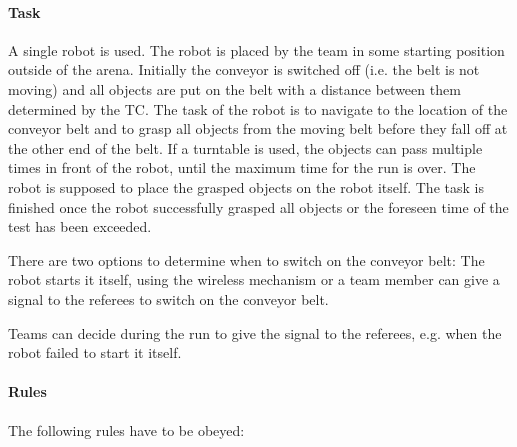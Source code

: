\paragraph{Task}
A single robot is used. The robot is placed by the team in some starting position outside of the arena. Initially the conveyor is switched off (i.e. the belt is not moving) and all objects are put on the belt with a distance between them determined by the TC. The task of the robot is to navigate to the location of the conveyor belt and to grasp all objects from the moving belt before they fall off at the other end of the belt. If a turntable is used, the objects can pass multiple times in front of the robot, until the maximum time for the run is over. The robot is supposed to place the grasped objects on the robot itself. The task is finished once the robot successfully grasped all objects or the foreseen time of the test has been exceeded. 
\par
There are two options to determine when to switch on the conveyor belt:
The robot starts it itself, using the wireless mechanism or a team member can give a signal to the referees to switch on the conveyor belt.
\par
Teams can decide during the run to give the signal to the referees, e.g. when the robot failed to start it itself. 




%



\paragraph{Rules}
The following rules have to be obeyed:


